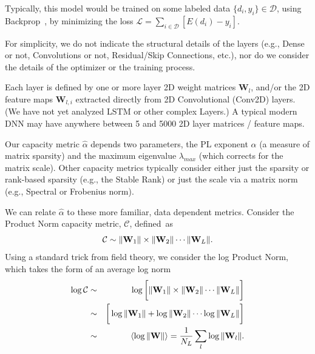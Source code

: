 Typically, this model would be trained on some labeled data $\{d_{i},y_{i}\}\in\mathcal{D}$, using Backprop~\cite{LBOM12_tricks}, by minimizing the loss $\mathcal{L}=\sum_{i\in\mathcal{D}}[E(d_{i})-y_{i}]$.

For simplicity, we do not indicate the structural details of the layers (e.g., Dense or not, Convolutions or not, Residual/Skip Connections, etc.), nor do we consider the details of the optimizer or the training process.

Each layer is defined by one or more layer 2D weight matrices $\mathbf{W}_{l}$, and/or the 2D feature maps $\mathbf{W}_{l,i}$ extracted directly from 2D Convolutional (Conv2D) layers.
(We have not yet analyzed LSTM or other complex Layers.)   A typical modern DNN may have anywhere between 5 and 5000 2D layer matrices / feature maps.

Our capacity metric $\hat{\alpha}$ depends two parameters, the PL exponent $\alpha$ (a measure of matrix sparsity) and the maximum eigenvalue $\lambda_{max}$ (which corrects for the matrix scale). 
Other capacity metrics typically consider either just the sparsity or rank-based sparsity (e.g., the Stable Rank) or just the scale via a matrix norm (e.g., Spectral or Frobenius norm).

We can relate  $\hat{\alpha}$  to these more familiar, data dependent metrics.  Consider the Product Norm capacity metric, $\mathcal{C}$, defined~as
\vspace{-2mm}
\begin{equation}
\mathcal{C}\sim\Vert\mathbf{W}_{1}\Vert\times\Vert\mathbf{W}_{2}\Vert\cdots\Vert\mathbf{W}_{L}\Vert   .
\vspace{-1mm}
\end{equation}
Using a standard trick from field theory, we consider the log Product Norm, which takes the form of an average log norm
\vspace{-2mm}
\begin{eqnarray*}
\log\mathcal{C} &\sim& \log\bigg[\Vert\mathbf{W}_{1}\Vert\times\Vert\mathbf{W}_{2}\Vert\cdots\Vert\mathbf{W}_{L}\Vert\bigg]  \\
                &\sim& \bigg[\log\Vert\mathbf{W}_{1}\Vert+\log\Vert\mathbf{W}_{2}\Vert\cdots\log\Vert\mathbf{W}_{L}\Vert\bigg]  \\
                &\sim&  \langle\log\Vert\mathbf{W}\Vert\rangle=\dfrac{1}{N_{L}}\sum_{l}\log\Vert\mathbf{W}_{l}\Vert   .
\vspace{-1mm}
\end{eqnarray*}


